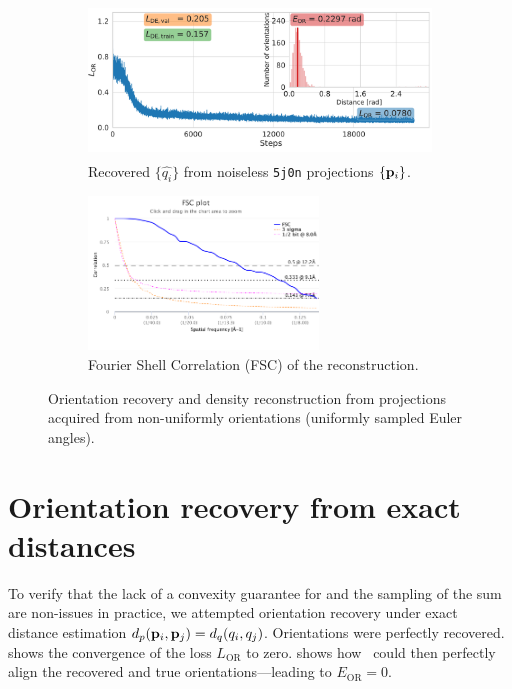 \begin{figure}[ht!]
    \centering
    \begin{subfigure}[b]{0.55\linewidth}
        \centering
        \includegraphics[height=11em]{figures/5j0n_ar_aa_fullcvg.pdf}
        \caption{Recovered $\{ \widehat{q_i} \}$ from noiseless \texttt{5j0n} projections $\{ \mathbf{p}_i \}$.}
    \end{subfigure}
    \hfill
    \begin{subfigure}[b]{0.4\linewidth}
        \centering
        \includegraphics[height=11em]{figures/FSC_5j0n_fullcvg_noise0_fin_vs_init.pdf}
        \caption{Fourier Shell Correlation (FSC) of the reconstruction.}
    \end{subfigure}
    \caption{%
        Orientation recovery and density reconstruction from projections acquired from non-uniformly orientations (uniformly sampled Euler angles).
    }\label{fig:recovery-nonuniform}
\end{figure}

\section{Orientation recovery from exact distances}\label{apx:results:orientation-recovery:exact}


To verify that the lack of a convexity guarantee for  and the sampling of the sum are non-issues in practice, we attempted orientation recovery under exact distance estimation $d_p(\mathbf{p}_i, \mathbf{p}_j) = d_q(q_i, q_j)$.
Orientations were perfectly recovered.
 shows the convergence of the loss $L_\text{OR}$ to zero.
 shows how~ could then perfectly align the recovered and true orientations---leading to $E_\text{OR} = 0$.

